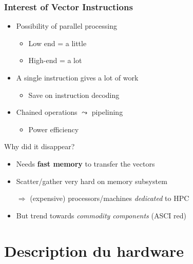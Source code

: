 \documentclass[xcolor={x11names,svgnames}]{beamer}
\newcommand{\red}[1]{{\color{red}#1}}
\begin{document}
\begin{frame}
  \frametitle{Interest of \red{Vector Instructions}}
  
  \begin{itemize}
  \item Possibility of parallel processing
    \begin{itemize}
    \item Low end = a little
    \item High-end = a lot
    \end{itemize}

    \medskip
    
  \item A single instruction gives a lot of work
    \begin{itemize}
    \item Save on instruction decoding
    \end{itemize}

    \medskip

  \item Chained operations $\leadsto$ pipelining
    \begin{itemize}
    \item Power efficiency
    \end{itemize}
  \end{itemize}

  \begin{alertblock}{Why did it disappear?}
    \begin{itemize}
    \item Needs \textbf{fast memory} to transfer the vectors
    \item Scatter/gather very hard on memory subsystem
    \item[$\Rightarrow$] (expensive) processors/machines \emph{dedicated} to HPC
    \item But trend towards \textit{commodity components} (ASCI red)
    \end{itemize}
  \end{alertblock}  
\end{frame}


\section{Description du hardware}
\end{document}
